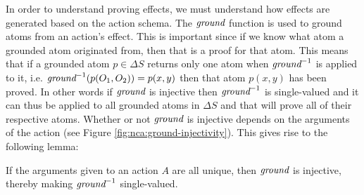 \documentclass[../Master.tex]{subfiles}
\begin{document}
In order to understand proving effects, we must understand how effects are generated based on the action schema.
The $\textit{ground}$ function is used to ground atoms from an action's effect. This is important since if we know what atom a grounded atom originated from, then that is a proof for that atom. This means that if a grounded atom $p \in \Delta S$ returns only one atom when $\textit{ground} ^{-1}$ is applied to it, i.e. $\textit{ground} ^{-1}(p(O_1,O_2)) = {p(x,y)}$ then that atom $p(x,y)$ has been proved. In other words if $\textit{ground}$ is injective then $\textit{ground} ^{-1}$ is single-valued and it can thus be applied to all grounded atoms in $\Delta S$ and that will prove all of their respective atoms.
Whether or not $\textit{ground}$ is injective depends on the arguments of the action (see Figure \ref*{fig:nca:ground-injectivity}).
This gives rise to the following lemma:
\begin{lemma}
If the arguments given to an action $A$ are all unique, then $\textit{ground}$ is injective, thereby making $\textit{ground} ^{-1}$ single-valued.
\end{lemma}
\end{document}
